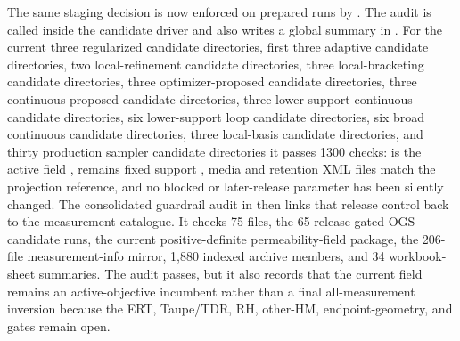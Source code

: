 The same staging decision is now enforced on prepared runs by
.  The audit is
called inside the candidate driver and also writes a global summary in
.  For the current three
regularized candidate directories, first three adaptive candidate directories, two
local-refinement candidate directories, three local-bracketing candidate directories,
three optimizer-proposed candidate directories, three continuous-proposed candidate
directories, three lower-support continuous candidate directories, six
lower-support loop candidate directories, six broad continuous candidate
directories, three local-basis candidate directories, and thirty production sampler
candidate directories it passes 1300 checks:
 is the active
 field ,  remains fixed support
, media and retention XML files match the projection reference,
and no blocked or later-release parameter has been silently changed.
The consolidated guardrail audit in
 then links
that release control back to the measurement catalogue.  It checks 75
 files, the 65 release-gated OGS candidate runs, the current
positive-definite permeability-field package, the 206-file measurement-info mirror,
1,880 indexed archive members, and 34 workbook-sheet summaries.  The audit passes,
but it also records that the current field remains an active-objective incumbent
rather than a final all-measurement inversion because the ERT, Taupe/TDR, RH,
other-HM, endpoint-geometry, and  gates remain open.


